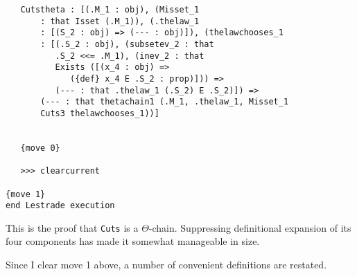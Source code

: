 \documentclass[12pt]{article}
\begin{document}
\begin{verbatim}
   Cutstheta : [(.M_1 : obj), (Misset_1 
       : that Isset (.M_1)), (.thelaw_1 
       : [(S_2 : obj) => (--- : obj)]), (thelawchooses_1 
       : [(.S_2 : obj), (subsetev_2 : that 
          .S_2 <<= .M_1), (inev_2 : that 
          Exists ([(x_4 : obj) => 
             ({def} x_4 E .S_2 : prop)])) => 
          (--- : that .thelaw_1 (.S_2) E .S_2)]) => 
       (--- : that thetachain1 (.M_1, .thelaw_1, Misset_1 
       Cuts3 thelawchooses_1))]


   {move 0}

   >>> clearcurrent

{move 1}
end Lestrade execution
\end{verbatim}

This is the proof that {\tt Cuts} is a $\Theta$-chain.  Suppressing definitional expansion of its four components has made it somewhat manageable in size.

Since I clear move 1 above, a number of convenient definitions are restated.
\end{document}
